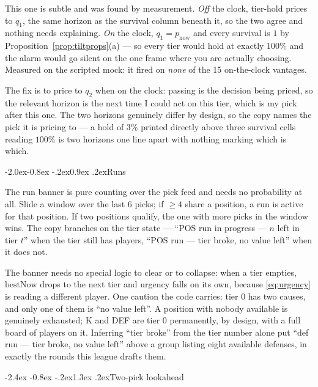 \documentclass[10pt,a4paper]{article}
\makeatletter
\theoremstyle{plain}
\theoremstyle{definition}
\theoremstyle{remark}
\renewcommand\section{\@startsection{section}{1}{\z@}%
  {-2.4ex \@plus -0.8ex \@minus -.2ex}{1.3ex \@plus.2ex}{\normalfont\Large\bfseries}}
\renewcommand\subsection{\@startsection{subsection}{2}{\z@}%
  {-2.0ex\@plus -0.8ex \@minus -.2ex}{0.9ex \@plus .2ex}{\normalfont\large\bfseries}}
\makeatother
\begin{document}
This one is subtle and was found by measurement. \emph{Off} the clock, tier-hold prices
to $q_1$, the same horizon as the survival column beneath it, so the two agree and
nothing needs explaining. \emph{On} the clock, $q_1 = p_{\text{now}}$ and every survival
is $1$ by Proposition~\ref{prop:tiltprops}(a) --- so every tier would hold at exactly
$100\%$ and the alarm would go silent on the one frame where you are actually choosing.
Measured on the scripted mock: it fired on \emph{none} of the 15 on-the-clock vantages.

The fix is to price to $q_2$ when on the clock: passing is the decision being priced, so
the relevant horizon is the next time I could act on this tier, which is my pick after
this one. The two horizons genuinely differ by design, so the copy names the pick it is
pricing to --- a hold of $3\%$ printed directly above three survival cells reading
$100\%$ is two horizons one line apart with nothing marking which is which.

\subsection{Runs}

The run banner is pure counting over the pick feed and needs no probability at all.
Slide a window over the last $6$ picks; if $\ge 4$ share a position, a run is active for
that position. If two positions qualify, the one with more picks in the window wins. The
copy branches on the tier state --- ``POS run in progress --- $n$ left in tier $t$'' when
the tier still has players, ``POS run --- tier broke, no value left'' when it does not.

The banner needs no special logic to clear or to collapse: when a tier empties,
$\mathrm{bestNow}$ drops to the next tier and urgency falls on its own, because
\eqref{eq:urgency} is reading a different player. One caution the code carries: tier $0$
has two causes, and only one of them is ``no value left''. A position with nobody
available is genuinely exhausted; K and DEF are tier $0$ permanently, by design, with a
full board of players on it. Inferring ``tier broke'' from the tier number alone put
``def run --- tier broke, no value left'' above a group listing eight available
defenses, in exactly the rounds this league drafts them.

\section{Two-pick lookahead}
\label{sec:plan}
\end{document}
